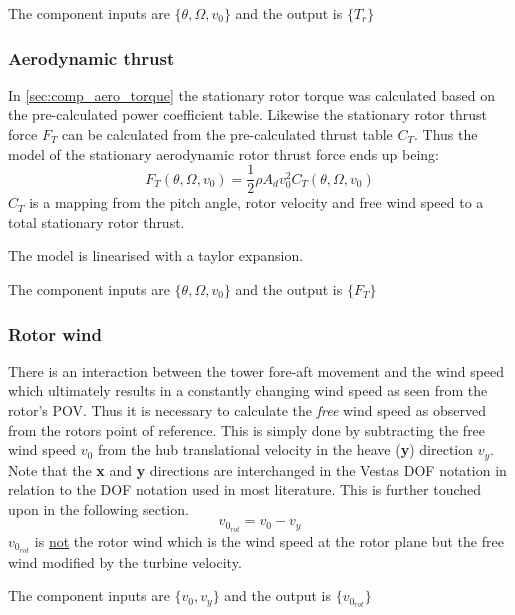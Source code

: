 The component inputs are $ \{\theta, \Omega, v_0\} $ and the output is $ \{T_r\} $

\subsubsection{Aerodynamic thrust} \label{sec:comp_aero_thrust}
In \cref{sec:comp_aero_torque} the stationary rotor torque was calculated based on the pre-calculated power coefficient table. Likewise the stationary rotor thrust force $ F_T $ can be calculated from the pre-calculated thrust table $ C_T $. Thus the model of the stationary aerodynamic rotor thrust force ends up being:
\begin{equation} \label{eq:comp_aero_thrust}
	F_T(\theta, \Omega, v_0) = \dfrac{1}{2} \rho A_d v_0^2 C_T(\theta, \Omega, v_0)
\end{equation}
$ C_T $ is a mapping from the pitch angle, rotor velocity and free wind speed to a total stationary rotor thrust.

The model is linearised with a taylor expansion.

The component inputs are $ \{\theta, \Omega, v_0 \} $ and the output is $ \{F_T\} $


\subsubsection{Rotor wind} \label{sec:comp_rot_wind}
There is an interaction between the tower fore-aft movement and the wind speed which ultimately results in a constantly changing wind speed as seen from the rotor's POV. Thus it is necessary to calculate the \textit{free} wind speed as observed from the rotors point of reference. This is simply done by subtracting the free wind speed $ v_0 $ from the hub translational velocity in the heave (\textbf{y}) direction $ v_y $. Note that the \textbf{x} and \textbf{y} directions are interchanged in the Vestas DOF notation in relation to the DOF notation used in most literature. This is further touched upon in the following section. 
\begin{equation}\label{eq:comp_rotorwind}
	v_{0_{rot}} = v_{0} - v_y
\end{equation}
$ v_{0_{rot}} $ is \underline{not} the rotor wind which is the wind speed at the rotor plane but the free wind modified by the turbine velocity.

The component inputs are $ \{v_0, v_y\} $ and the output is $ \{v_{0_{rot}}\} $


